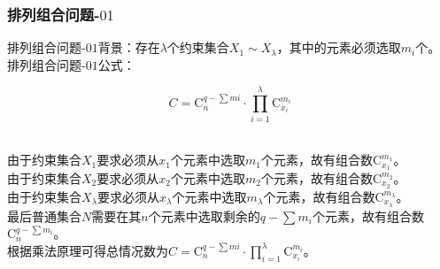 \documentclass[UTF8]{ctexart}
\newcommand{\rnum}[1]{\uppercase\expandafter{\romannumeral #1\relax}}
\newcommand{\Co}{\mathrm{C}}
\begin{document}
\subsubsection{排列组合问题\rnum{2}-$01$}
    排列组合问题\rnum{2}-$01$背景：存在$\lambda$个约束集合$X_1\sim X_\lambda$，其中的元素必须选取$m_i$个。\\[3mm]
    排列组合问题\rnum{2}-$01$公式：
    \begin{large}
        \begin{equation*}
            C=\Co_n^{q-\sum mi}\cdot\prod_{i=1}^{\lambda}\Co_{x_i}^{m_i}
        \end{equation*}
    \end{large}\\
    由于约束集合$X_1$要求必须从$x_1$个元素中选取$m_1$个元素，故有组合数$\Co_{x_1}^{m_1}$。\\[3mm]
    由于约束集合$X_2$要求必须从$x_2$个元素中选取$m_2$个元素，故有组合数$\Co_{x_2}^{m_2}$。\\[3mm]
    由于约束集合$X_\lambda$要求必须从$x_\lambda$个元素中选取$m_\lambda$个元素，故有组合数$\Co_{x_\lambda}^{m_\lambda}$。\\[3mm]
    最后普通集合$N$需要在其$n$个元素中选取剩余的$q-\sum m_i$个元素，故有组合数$\Co_{n}^{q-\sum m_i}$。\\[3mm]
    根据乘法原理可得总情况数为$C=\Co_n^{q-\sum mi}\cdot\prod_{i=1}^{\lambda}\Co_{x_i}^{m_i}$。

\newpage
\end{document}
